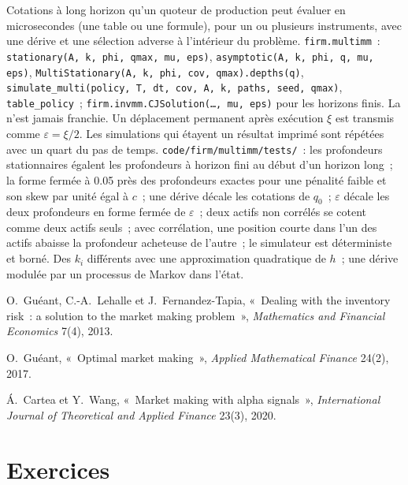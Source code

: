 \begin{build}
 Cotations à long horizon qu'un quoteur de production peut évaluer en microsecondes (une table ou une formule), pour un ou plusieurs instruments,
avec une dérive et une sélection adverse à l'intérieur du problème.
 \texttt{firm.multimm}~: \texttt{stationary(A, k, phi, qmax, mu, eps)}, \texttt{asymptotic(A, k, phi, q, mu, eps)},
\texttt{MultiStationary(A, k, phi, cov, qmax).depths(q)}, \texttt{simulate\_multi(policy, T, dt, cov, A, k, paths, seed, qmax)},
\texttt{table\_policy}~; \texttt{firm.invmm.CJSolution(\dots, mu, eps)} pour les horizons finis.
 La  n'est jamais franchie. Un déplacement permanent après exécution $\xi$ est transmis comme $\varepsilon=\xi/2$. Les simulations qui étayent un
résultat imprimé sont répétées avec un quart du pas de temps.
 \texttt{code/firm/multimm/tests/}~: les profondeurs stationnaires égalent les profondeurs à horizon fini au début d'un horizon long~; la
forme fermée à 0.05 près des profondeurs exactes pour une pénalité faible et son skew par unité égal à $c$~; une dérive décale les cotations de $q_0$~; $\varepsilon$
décale les deux profondeurs en forme fermée de $\varepsilon$~; deux actifs non corrélés se cotent comme deux actifs seuls~; avec corrélation, une position courte dans l'un
des actifs abaisse la profondeur acheteuse de l'autre~; le simulateur est déterministe et borné.
 Des $k_i$ différents avec une approximation quadratique de $h$~; une dérive modulée par un processus de Markov dans l'état.
\end{build}

\begin{omsources}
\item O.~Guéant, C.-A.~Lehalle et J.~Fernandez-Tapia, «~Dealing with the inventory risk~: a solution to the market making problem~»,
\emph{Mathematics and Financial Economics} 7(4), 2013.
\item O.~Guéant, «~Optimal market making~», \emph{Applied Mathematical Finance} 24(2), 2017.
\item Á.~Cartea et Y.~Wang, «~Market making with alpha signals~», \emph{International Journal of Theoretical and Applied Finance} 23(3), 2020.
\end{omsources}

\section{Exercices}

